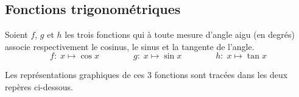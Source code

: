 \begin{center}
\begin{tikzpicture}[scale=3,cap=round]
\end{tikzpicture}
\end{center}


\subsection{Fonctions trigonométriques}

Soient $f$, $g$ et $h$ les trois fonctions qui à toute mesure d'angle aigu  (en degrés) associe respectivement le cosinus, le sinus et la tangente de l'angle. 
\[f:\; x\mapsto \cos x\qquad\qquad g:\; x\mapsto \sin x\qquad\qquad h:\; x\mapsto \tan x\]

Les représentations graphiques de ces 3 fonctions sont tracées dans les deux repères ci-dessous.

